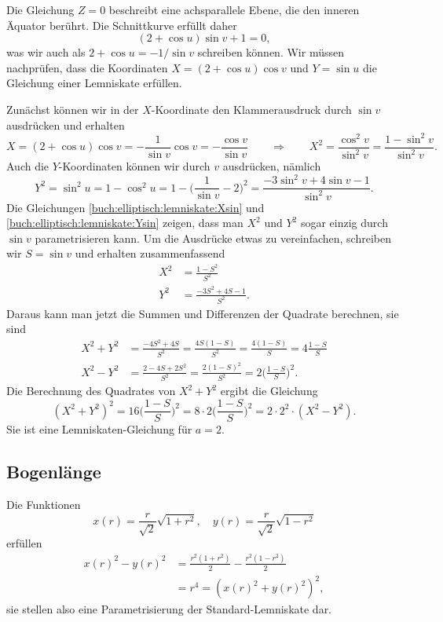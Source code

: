 Die Gleichung $Z=0$ beschreibt eine achsparallele Ebene, die den
inneren Äquator berührt.
Die Schnittkurve erfüllt daher
\[
(2+\cos u)\sin v + 1 = 0,
\]
was wir auch als $2 +\cos u = -1/\sin v$ schreiben können.
Wir müssen nachprüfen, dass die Koordinaten
$X=(2+\cos u)\cos v$ und $Y=\sin u$ die Gleichung einer Lemniskate
erfüllen.

Zunächst können wir in der $X$-Koordinate den Klammerausdruck durch
$\sin v$ ausdrücken und erhalten
\begin{equation}
X
=
(2+\cos u) \cos v
=
-\frac{1}{\sin v}\cos v
=
-\frac{\cos v}{\sin v}
\qquad\Rightarrow\qquad
X^2
=
\frac{\cos^2v}{\sin^2 v}
=
\frac{1-\sin^2v}{\sin^2 v}.
\label{buch:elliptisch:lemniskate:Xsin}
\end{equation}
Auch die $Y$-Koordinaten können wir durch $v$ ausdrücken, 
nämlich
\begin{equation}
Y^2=\sin^2 u = 1-\cos^2 u
=
1-
\biggl(
\frac{1}{\sin v}
-2
\biggr)^2
=
\frac{-3\sin^2 v+4\sin v-1}{\sin^2 v}.
\label{buch:elliptisch:lemniskate:Ysin}
\end{equation}
Die Gleichungen
\eqref{buch:elliptisch:lemniskate:Xsin}
und
\eqref{buch:elliptisch:lemniskate:Ysin}
zeigen, dass man $X^2$ und $Y^2$ sogar einzig durch $\sin v$ 
parametrisieren kann.
Um die Ausdrücke etwas zu vereinfachen, schreiben wir $S=\sin v$
und erhalten zusammenfassend
\begin{equation}
\begin{aligned}
X^2
&=
\frac{1-S^2}{S^2}
\\
Y^2
&=
\frac{-3S^2+4S-1}{S^2}.
\end{aligned}
\end{equation}
Daraus kann man jetzt die Summen und Differenzen der Quadrate
berechnen, sie sind
\begin{equation}
\begin{aligned}
X^2+Y^2
&=
\frac{-4S^2+4S}{S^2}
=
\frac{4S(1-S)}{S^2}
=
\frac{4(1-S)}{S}
=
4\frac{1-S}{S}
\\
X^2-Y^2
&=
\frac{2-4S+2S^2}{S^2}
=
\frac{2(1-S)^2}{S^2}
=
2\biggl(\frac{1-S}{S}\biggr)^2.
\end{aligned}
\end{equation}
Die Berechnung des Quadrates von $X^2+Y^2$ ergibt die Gleichung
\[
(X^2+Y^2)^2
=
16
\biggl(\frac{1-S}{S}\biggr)^2
=
8 \cdot 2
\biggl(\frac{1-S}{S}\biggr)^2
=
2\cdot 2^2\cdot (X^2-Y^2).
\]
Sie ist eine Lemniskaten-Gleichung für $a=2$.

%
%
\subsection{Bogenlänge}
Die Funktionen
\begin{equation}
x(r) = \frac{r}{\sqrt{2}}\sqrt{1+r^2},
\quad
y(r) = \frac{r}{\sqrt{2}}\sqrt{1-r^2}
\label{buch:geometrie:eqn:lemniskateparam}
\end{equation}
erfüllen
\begin{align*}
x(r)^2-y(r)^2
&=
\frac{r^2(1+r^2)}{2}-\frac{r^2(1-r^2)}{2}
\\
&
=
r^4
=
(x(r)^2 + y(r)^2)^2,
\end{align*}
sie stellen also eine Parametrisierung der Standard-Lemniskate dar.

